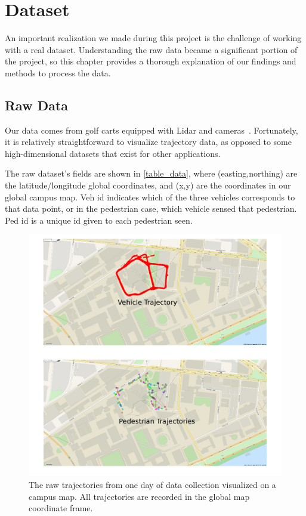 
\section{Dataset} \label{sec:dataset}


An important realization we made during this project is the challenge of working with a real dataset.
Understanding the raw data became a significant portion of the project, so this chapter provides a thorough explanation of our findings and methods to process the data.

\subsection{Raw Data}

Our data comes from golf carts equipped with Lidar and cameras~\cite{Miller16_IROS,Miller17_predictive_ICRA}.
Fortunately, it is relatively straightforward to visualize trajectory data, as opposed to some high-dimensional datasets that exist for other applications. 

The raw dataset's fields are shown in \cref{table_data}, where (easting,northing) are the latitude/longitude global coordinates, and (x,y) are the coordinates in our global campus map.
Veh id indicates which of the three vehicles corresponds to that data point, or in the pedestrian case, which vehicle sensed that pedestrian.
Ped id is a unique id given to each pedestrian seen.

\begin{figure}
	\centering
	\includegraphics [trim=0 0 0 0, clip, angle=0, width=0.8\columnwidth,
	keepaspectratio]{figures/traj_on_map}
	\caption{The raw trajectories from one day of data collection visualized on a campus map. All trajectories are recorded in the global map coordinate frame.} 
	\label{fig:traj_on_map} 
\end{figure}

